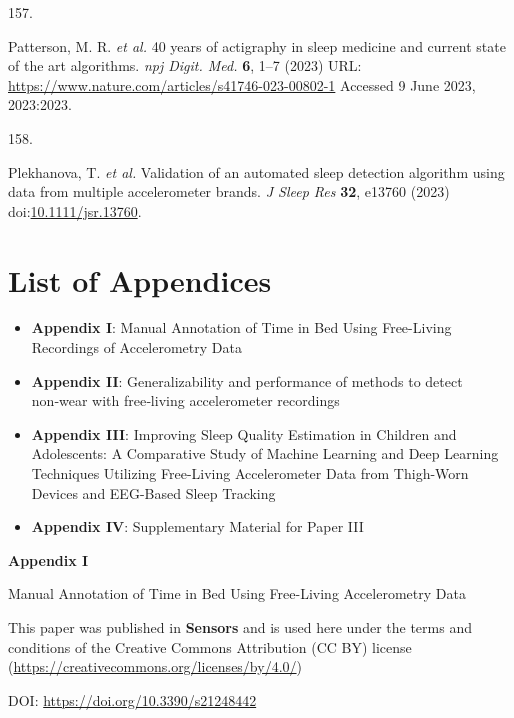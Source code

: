 \documentclass[
  10pt,
]{scrbook}
\newlength{\cslhangindent}
\newlength{\csllabelwidth}
\newlength{\cslentryspacingunit} %
\newenvironment{CSLReferences}[2] %
 {%
  \setlength{\parindent}{0pt}
  \ifodd #1
  \let\oldpar\par
  \def\par{\hangindent=\cslhangindent\oldpar}
  \fi
  \setlength{\parskip}{#2\cslentryspacingunit}
 }%
 {}
\newcommand{\CSLLeftMargin}[1]{\parbox[t]{\csllabelwidth}{#1}}
\newcommand{\CSLRightInline}[1]{\parbox[t]{\linewidth - \csllabelwidth}{#1}\break}
\begin{document}
\begin{CSLReferences}{0}{0}
\leavevmode{}%
\CSLLeftMargin{157. }%
\CSLRightInline{Patterson, M. R. \emph{et al.} 40 years of actigraphy in
sleep medicine and current state of the art algorithms. \emph{npj Digit.
Med.} \textbf{6}, 1--7 (2023) URL:
\url{https://www.nature.com/articles/s41746-023-00802-1} Accessed 9 June
2023, 2023:2023.}

\leavevmode{}%
\CSLLeftMargin{158. }%
\CSLRightInline{Plekhanova, T. \emph{et al.} Validation of an automated
sleep detection algorithm using data from multiple accelerometer brands.
\emph{J Sleep Res} \textbf{32}, e13760 (2023)
doi:\href{https://doi.org/10.1111/jsr.13760}{10.1111/jsr.13760}.}

\end{CSLReferences}

\hypertarget{list-of-appendices}{%
\chapter{List of Appendices}\label{list-of-appendices}}

\begin{itemize}
\item
  \textbf{Appendix I}: Manual Annotation of Time in Bed Using
  Free-Living Recordings of Accelerometry Data
\item
  \textbf{Appendix II}: Generalizability and performance of methods to
  detect non‑wear with free‑living accelerometer recordings
\item
  \textbf{Appendix III}: Improving Sleep Quality Estimation in Children
  and Adolescents: A Comparative Study of Machine Learning and Deep
  Learning Techniques Utilizing Free-Living Accelerometer Data from
  Thigh-Worn Devices and EEG-Based Sleep Tracking
\item
  \textbf{Appendix IV}: Supplementary Material for Paper III
\end{itemize}

\newpage

\begin{center}

\textbf{\textsf{\Huge Appendix I}}



\vspace{2cm}

\textsf{\Huge Manual Annotation of Time in Bed Using Free-Living Accelerometry Data}

\vspace{5cm}

This paper was published in \textbf{Sensors} and is used here under the terms and conditions of the Creative Commons Attribution (CC BY) license (\href{https://creativecommons.org/licenses/by/4.0/}{https://creativecommons.org/licenses/by/4.0/})

\vspace{1cm}

DOI: \href{https://doi.org/10.3390/s21248442}{https://doi.org/10.3390/s21248442}

\end{center}
\end{document}
